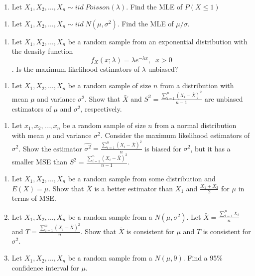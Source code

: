 \documentclass[]{book}
\providecommand{\tightlist}{%
  \setlength{\itemsep}{0pt}\setlength{\parskip}{0pt}}
\begin{document}
\begin{enumerate}
\def\labelenumi{\arabic{enumi}.}
\setcounter{enumi}{8}
\tightlist
\item
  Let \(X_1, X_2, \dots, X_n \sim iid \; Poisson (\lambda)\). Find the MLE of \(P(X\leq 1)\)
\end{enumerate}

\begin{enumerate}
\def\labelenumi{\arabic{enumi}.}
\setcounter{enumi}{9}
\tightlist
\item
  Let \(X_1, X_2, \dots, X_n \sim iid \; N (\mu, \sigma^2)\). Find the MLE of \(\mu/\sigma\).
\end{enumerate}

\begin{enumerate}
\def\labelenumi{\arabic{enumi}.}
\setcounter{enumi}{10}
\tightlist
\item
  Let \(X_1, X_2, \dots, X_n\) be a random sample from an exponential distribution with the density function
  \[f_X(x;\lambda)= \lambda e^{-\lambda x},\;\; x>0\]. Is the maximum likelihood estimators of \(\lambda\) unbiased?
\end{enumerate}

\begin{enumerate}
\def\labelenumi{\arabic{enumi}.}
\setcounter{enumi}{11}
\tightlist
\item
  Let \(X_1, X_2, \dots, X_n\) be a random sample of size \(n\) from a distribution with mean \(\mu\) and variance \(\sigma^2\). Show that \(\bar{X}\) and \(S^2 = \frac{\sum_{i=1}^n(X_i-\bar{X})^2}{n-1}\) are unbiased estimators of \(\mu\) and \(\sigma^2\), respectively.
\end{enumerate}

\begin{enumerate}
\def\labelenumi{\arabic{enumi}.}
\setcounter{enumi}{12}
\tightlist
\item
  Let \(x_1, x_2, \dots, x_n\) be a random sample of size \(n\) from a normal distribution with mean \(\mu\) and variance \(\sigma^2\). Consider the maximum likelihood estimators of \(\sigma^2\). Show the estimator \(\hat{\sigma^2} = \frac{\sum_{i=1}^n(X_i-\bar{X})^2}{n}\) is biased for \(\sigma^2\), but it has a smaller MSE than \(S^2 = \frac{\sum_{i=1}^n(X_i-\bar{X})^2}{n-1}\).
\end{enumerate}

\begin{enumerate}
\def\labelenumi{\arabic{enumi}.}
\setcounter{enumi}{13}
\item
  Let \(X_1, X_2, \dots, X_n\) be a random sample from some distribution and \(E(X) = \mu\). Show that \(\bar{X}\) is a better estimator than \(X_1\) and \(\frac{X_1+X_2}{2}\) for \(\mu\) in terms of MSE.
\item
  Let \(X_1, X_2, \dots, X_n\) be a random sample from a \(N(\mu, \sigma^2).\) Let \(\bar{X}= \frac{\sum_{i=1}^nX_i}{n}\) and \(T=\frac{\sum_{i=1}^n(X_i-\bar{X})^2}{n}\). Show that \(\bar{X}\) is consistent for \(\mu\) and \(T\) is consistent for \(\sigma^2.\)
\item
  Let \(X_1, X_2, \dots, X_n\) be a random sample from a \(N(\mu,9).\) Find a 95\% confidence interval for \(\mu\).
\end{enumerate}
\end{document}

